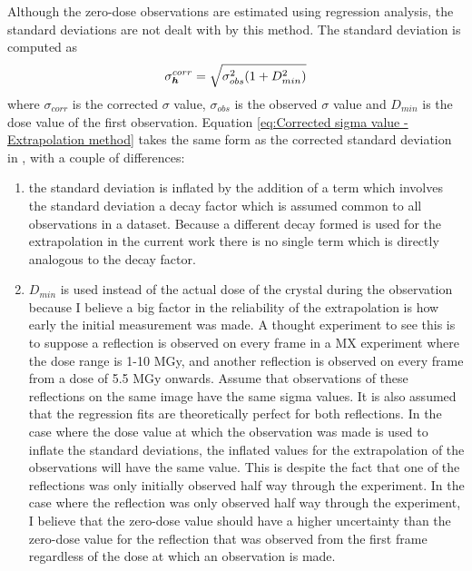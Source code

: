 Although the zero-dose observations are estimated using regression analysis, the standard deviations are not dealt with by this method.
The standard deviation is computed as
\begin{equation}
    \sigma^{corr}_{\boldsymbol{h}} = \sqrt{\sigma^2_{obs}(1 + D^2_{min})}
    \label{eq:Corrected sigma value - Extrapolation method}
\end{equation}
where $\sigma_{corr}$ is the corrected $\sigma$ value, $\sigma_{obs}$ is the observed $\sigma$ value and $D_{min}$ is the dose value of the first observation.
Equation \ref{eq:Corrected sigma value - Extrapolation method} takes the same form as the corrected standard deviation in \cite{diederichs2003}, with a couple of differences:
\begin{enumerate}
    \item the standard deviation is inflated by the addition of a term which involves the standard deviation a decay factor which is assumed common to all observations in a dataset.
    Because a different decay formed is used for the extrapolation in the current work there is no single term which is directly analogous to the decay factor.
    \item $D_{min}$ is used instead of the actual dose of the crystal during the observation because I believe a big factor in the reliability of the extrapolation is how early the initial measurement was made.
    A thought experiment to see this is to suppose a reflection is observed on every frame in a MX experiment where the dose range is 1-10 MGy, and another reflection is observed on every frame from a dose of 5.5 MGy onwards.
    Assume that observations of these reflections on the same image have the same sigma values.
    It is also assumed that the regression fits are theoretically perfect for both reflections.
    In the case where the dose value at which the observation was made is used to inflate the standard deviations, the inflated values for the extrapolation of the observations will have the same value.
    This is despite the fact that one of the reflections was only initially observed half way through the experiment.
    In the case where the reflection was only observed half way through the experiment, I believe that the zero-dose value should have a higher uncertainty than the zero-dose value for the reflection that was observed from the first frame regardless of the dose at which an observation is made.
\end{enumerate}

